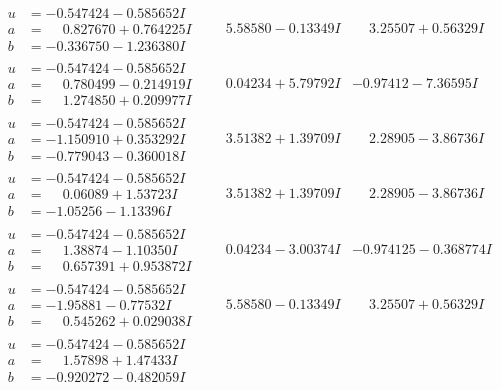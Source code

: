 \documentclass[1p]{elsarticle_modified}
\theoremstyle{definition}
\begin{document}
$$\begin{array}{c|c|c}
\begin{aligned}
u &= -0.547424 - 0.585652 I \\
a &= \phantom{-}0.827670 + 0.764225 I \\
b &= -0.336750 - 1.236380 I\end{aligned}
 & \phantom{-}5.58580 - 0.13349 I & \phantom{-}3.25507 + 0.56329 I \\ \hline\begin{aligned}
u &= -0.547424 - 0.585652 I \\
a &= \phantom{-}0.780499 - 0.214919 I \\
b &= \phantom{-}1.274850 + 0.209977 I\end{aligned}
 & \phantom{-}0.04234 + 5.79792 I & -0.97412 - 7.36595 I \\ \hline\begin{aligned}
u &= -0.547424 - 0.585652 I \\
a &= -1.150910 + 0.353292 I \\
b &= -0.779043 - 0.360018 I\end{aligned}
 & \phantom{-}3.51382 + 1.39709 I & \phantom{-}2.28905 - 3.86736 I \\ \hline\begin{aligned}
u &= -0.547424 - 0.585652 I \\
a &= \phantom{-}0.06089 + 1.53723 I \\
b &= -1.05256 - 1.13396 I\end{aligned}
 & \phantom{-}3.51382 + 1.39709 I & \phantom{-}2.28905 - 3.86736 I \\ \hline\begin{aligned}
u &= -0.547424 - 0.585652 I \\
a &= \phantom{-}1.38874 - 1.10350 I \\
b &= \phantom{-}0.657391 + 0.953872 I\end{aligned}
 & \phantom{-}0.04234 - 3.00374 I & -0.974125 - 0.368774 I \\ \hline\begin{aligned}
u &= -0.547424 - 0.585652 I \\
a &= -1.95881 - 0.77532 I \\
b &= \phantom{-}0.545262 + 0.029038 I\end{aligned}
 & \phantom{-}5.58580 - 0.13349 I & \phantom{-}3.25507 + 0.56329 I \\ \hline\begin{aligned}
u &= -0.547424 - 0.585652 I \\
a &= \phantom{-}1.57898 + 1.47433 I \\
b &= -0.920272 - 0.482059 I\end{aligned}

\end{array}$$
\end{document}
